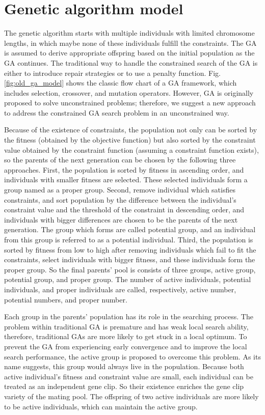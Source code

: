 \section{Genetic algorithm model}
The genetic algorithm starts with multiple individuals with limited chromosome lengths, in
which maybe none of these individuals fulfill the constraints. The GA is
assumed to derive appropriate offspring based on the initial population as the
GA continues. The traditional way to handle the constrained search of the GA is
either to introduce repair strategies or to use a penalty function. Fig.
\ref{fig:old_ga_model} shows the classic flow chart of a GA framework, which
includes selection, crossover, and mutation operators. However, GA is originally
proposed to solve unconstrained problems; therefore, we suggest a new approach 
to address the constrained GA search problem in an unconstrained way. 


Because of the existence of constraints, the population not only can be sorted
by the fitness (obtained by the objective function) but also sorted by
the constraint value obtained by the constraint function (assuming a constraint
function exists), so the parents of the next generation can be chosen by the
following three approaches. First, the population is sorted by fitness in
ascending order, and individuals with smaller fitness are selected. These
selected individuals form a group named as a proper group. Second, remove
individual which satisfies constraints, and sort population by the difference
between the individual's constraint value and the threshold of the constraint
in descending order, and individuals with bigger differences are chosen to be
the parents of the next generation. The group which forms are called potential
group, and an individual from this group is referred to as a potential
individual.  Third, the population is sorted by fitness from low to high after
removing individuals which fail to fit the constraints, select individuals
with bigger fitness, and these individuals form the proper group.  So the final
parents' pool is consists of three groups, active group, potential group, and
proper group.  The number of active individuals, potential individuals, and
proper individuals are called, respectively, active number, potential numbers,
and proper number. 

Each group in the parents' population has its role in the searching
process. The problem within traditional GA is premature and has weak local
search ability, therefore, traditional GAs are more likely to get stuck in a
local optimum. To prevent the GA from experiencing early convergence and to
improve the local search performance, the active group is proposed to overcome
this problem. As its name suggests, this group would always live in the
population.  Because both active individual's fitness and constraint value are small,
each individual can be treated as an independent gene clip. So their existence
enriches the gene clip variety of the mating pool. The offspring of two active
individuals are more likely to be active individuals, which can maintain the
active group.

